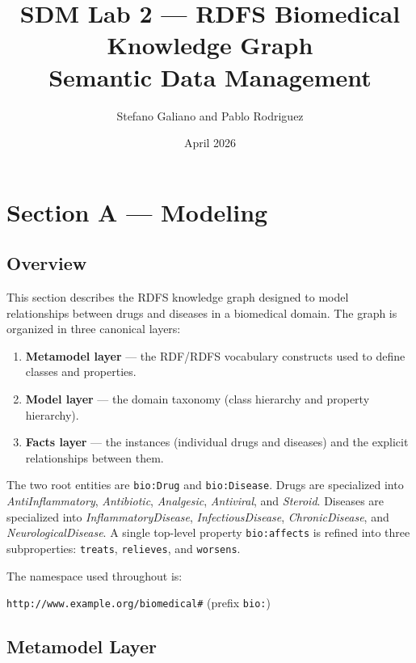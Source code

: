 \documentclass[11pt,a4paper]{article}
\title{\textbf{SDM Lab 2 — RDFS Biomedical Knowledge Graph}\\[0.4em]
       \large Semantic Data Management}
\author{Stefano Galiano and Pablo Rodriguez}
\date{April 2026}
\begin{document}
\maketitle
\newpage

\section{Section A — Modeling}

\subsection{Overview}

This section describes the RDFS knowledge graph designed to model relationships
between drugs and diseases in a biomedical domain.  The graph is organized in
three canonical layers:

\begin{enumerate}[noitemsep]
  \item \textbf{Metamodel layer} — the RDF/RDFS vocabulary constructs used to
        define classes and properties.
  \item \textbf{Model layer} — the domain taxonomy (class hierarchy and
        property hierarchy).
  \item \textbf{Facts layer} — the instances (individual drugs and diseases) and
        the explicit relationships between them.
\end{enumerate}

The two root entities are \texttt{bio:Drug} and \texttt{bio:Disease}.  Drugs are
specialized into \emph{AntiInflammatory}, \emph{Antibiotic}, \emph{Analgesic},
\emph{Antiviral}, and \emph{Steroid}.  Diseases are specialized into
\emph{InflammatoryDisease}, \emph{InfectiousDisease}, \emph{ChronicDisease},
and \emph{NeurologicalDisease}.  A single top-level property \texttt{bio:affects}
is refined into three subproperties: \texttt{treats}, \texttt{relieves}, and
\texttt{worsens}.

The namespace used throughout is:
\begin{center}
  \texttt{http://www.example.org/biomedical\#} \quad (prefix \texttt{bio:})
\end{center}

\subsection{Metamodel Layer}
\end{document}
